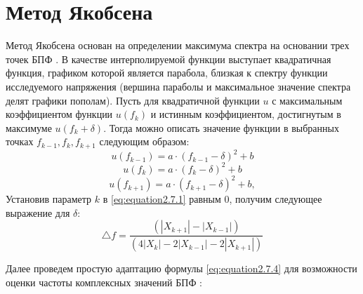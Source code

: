 


\section{Метод Якобсена} \label{sec:ch3/sect7}
Метод Якобсена основан на определении максимума спектра на основании трех точек БПФ \cite{4205098, ericjacobsen_cite, jacobsen1994local, jacobsen2007fast}. В качестве интерполируемой функции выступает квадратичная функция, графиком которой является парабола, близкая к спектру функции исследуемого напряжения (вершина параболы и максимальное значение спектра делят графики пополам). 
Пусть для квадратичной функции $u$ с максимальным коэффициентом функции $u(f_k)$  и истинным коэффициентом, достигнутым в максимуме $u(f_k + \delta)$. Тогда можно описать значение функции   в выбранных точках $f_{k-1}, f_k , f_{k+1}$ следующим образом:
\begin{equation}
\label{eq:equation2.7.1}
u(f_{k-1}) = a \cdot (f_{k-1}-\delta)^2+b
\end{equation}	
\begin{equation}
\label{eq:equation2.7.2}
u(f_k) = a \cdot (f_k-\delta)^2+b
\end{equation}	
\begin{equation}
\label{eq:equation2.7.3}
u(f_{k+1}) = a \cdot (f_{k+1}-\delta)^2+b,
\end{equation}	
Установив параметр $k$ в \ref{eq:equation2.7.1} равным $0$, получим следующее выражение для $\delta$:
\begin{equation}
	\label{eq:equation2.7.4}
	\bigtriangleup f = \frac{(|X_{k+1}|-|X_{k-1}|)}{(4|X_{k}|-2|X_{k-1}|-2|X_{k+1}|)}
\end{equation}

Далее проведем простую адаптацию формулы \ref{eq:equation2.7.4} для возможности оценки частоты комплексных значений БПФ \cite{ericjacobsen_cite}:

